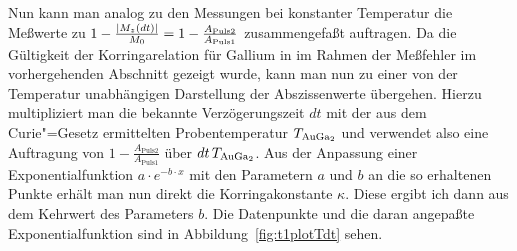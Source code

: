 Nun kann man analog zu den Messungen bei konstanter Temperatur die Meßwerte zu
$1-\frac{\abs{M_z(dt)}}{M_0}=1-\frac{A_\mathrm{Puls2}}{A_\mathrm{Puls1}}$
zusammengefaßt auftragen. Da die Gültigkeit der Korringarelation für Gallium in \aug{} im Rahmen der
Meßfehler im vorhergehenden Abschnitt gezeigt wurde, kann man nun zu einer von der Temperatur
unabhängigen Darstellung der Abs\-zis\-sen\-wer\-te übergehen. Hierzu multipliziert man die bekannte
Verzögerungszeit $dt$ mit der aus dem Curie"=Gesetz ermittelten Probentemperatur $T_\aug$ und
verwendet also eine Auftragung von $1-\frac{A_\mathrm{Puls2}}{A_\mathrm{Puls1}}$ über
$dt\,T_\aug$. Aus der Anpassung einer Exponentialfunktion $a\cdot e^{-b\cdot x}$ mit den
Parametern $a$ und $b$ an die so erhaltenen Punkte erhält man nun direkt die Korringakonstante
$\kappa$. Diese ergibt ich dann aus dem Kehrwert des Parameters $b$. Die Datenpunkte und die daran
angepaßte Exponentialfunktion sind in Abbildung~\ref{fig:t1plotTdt} sehen.

